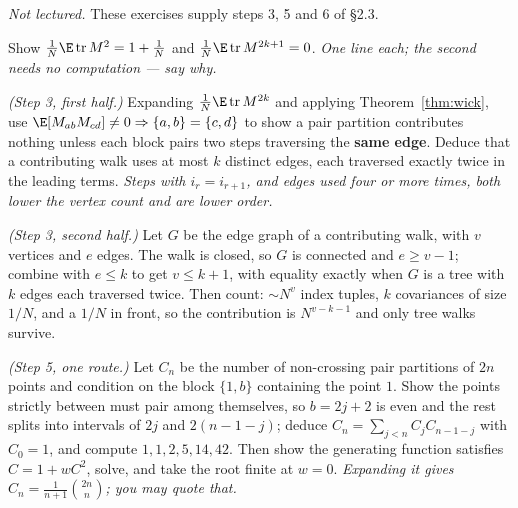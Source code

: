 \documentclass[11pt]{article}
\providecommand{\Tr}{\operatorname{tr}}
\begin{document}
\label{sec:walks}

\emph{Not lectured.} These exercises supply steps 3, 5 and 6 of \S2.3.

\begin{exercise}[\ty{A}]
Show $\frac1N\E\Tr M^2=1+\frac1N$ and $\frac1N\E\Tr M^{2k+1}=0$. \emph{One line each; the second needs no computation --- say why.}
\end{exercise}

\begin{exercise}[\ty{B}]
\emph{(Step 3, first half.)} Expanding $\frac1N\E\Tr M^{2k}$ and applying Theorem~\ref{thm:wick}, use $\E[M_{ab}M_{cd}]\ne0\Rightarrow\{a,b\}=\{c,d\}$ to show a pair partition contributes nothing unless each block pairs two steps traversing the \textbf{same edge}. Deduce that a contributing walk uses at most $k$ distinct edges, each traversed exactly twice in the leading terms. \emph{Steps with $i_r=i_{r+1}$, and edges used four or more times, both lower the vertex count and are lower order.}
\end{exercise}

\begin{exercise}[\ty{B}]
\emph{(Step 3, second half.)} Let $G$ be the edge graph of a contributing walk, with $v$ vertices and $e$ edges. The walk is closed, so $G$ is connected and $e\ge v-1$; combine with $e\le k$ to get $v\le k+1$, with equality exactly when $G$ is a tree with $k$ edges each traversed twice. Then count: $\sim N^v$ index tuples, $k$ covariances of size $1/N$, and a $1/N$ in front, so the contribution is $N^{v-k-1}$ and only tree walks survive.
\end{exercise}

\begin{exercise}[\ty{C}]
\emph{(Step 5, one route.)} Let $C_n$ be the number of non-crossing pair partitions of $2n$ points and condition on the block $\{1,b\}$ containing the point $1$. Show the points strictly between must pair among themselves, so $b=2j+2$ is even and the rest splits into intervals of $2j$ and $2(n-1-j)$; deduce $C_n=\sum_{j<n}C_jC_{n-1-j}$ with $C_0=1$, and compute $1,1,2,5,14,42$. Then show the generating function satisfies $C=1+wC^2$, solve, and take the root finite at $w=0$. \emph{Expanding it gives $C_n=\frac1{n+1}\binom{2n}{n}$; you may quote that.}
\end{exercise}
\end{document}
